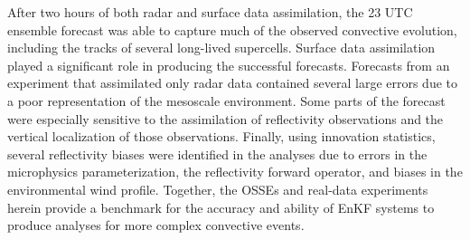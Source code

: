 \begin{preface}
After two hours of both radar and surface data assimilation, the 23 UTC ensemble forecast was able to capture much of the observed convective evolution, including the tracks of several long-lived supercells. Surface data assimilation played a significant role in producing the successful forecasts. Forecasts from an experiment that assimilated only radar data contained several large errors due to a poor representation of the mesoscale environment. Some parts of the forecast were especially sensitive to the assimilation of reflectivity observations and the vertical localization of those observations. Finally, using innovation statistics, several reflectivity biases were identified in the analyses due to errors in the microphysics parameterization, the reflectivity forward operator, and biases in the environmental wind profile. Together, the OSSEs and real-data experiments herein provide a benchmark for the accuracy and ability of EnKF systems to produce analyses for more complex convective events.
\end{preface}
